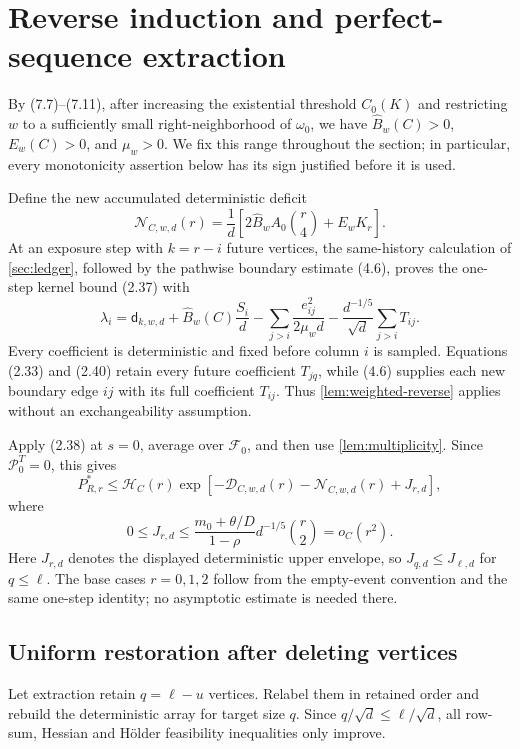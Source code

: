 \section{Reverse induction and perfect-sequence extraction}\label{sec:induction}

By (7.7)--(7.11), after increasing the existential threshold \(C_0(K)\) and
restricting \(w\) to a sufficiently small right-neighborhood of
\(\omega_0\), we have
\(\widehat B_w(C)>0\), \(E_w(C)>0\), and \(\mu_w>0\).  We fix this range
throughout the section; in particular, every monotonicity assertion below
has its sign justified before it is used.

Define the new accumulated deterministic deficit
\[
 \mathcal N_{C,w,d}(r)=\frac1d\left[
 2\widehat B_wA_0\binom r4+E_wK_r\right].
\tag{6.1}
\]
At an exposure step with \(k=r-i\) future vertices, the same-history
calculation of \cref{sec:ledger}, followed by the pathwise boundary estimate
(4.6), proves the one-step kernel bound (2.37) with
\[
 \lambda_i=\mathsf d_{k,w,d}
 +\widehat B_w(C)\frac{S_i}{d}
 -\sum_{j>i}\frac{e_{ij}^2}{2\mu_wd}
 -\frac{d^{-1/5}}{\sqrt d}\sum_{j>i}T_{ij}.
\tag{6.2}
\]
Every coefficient is deterministic and fixed before column \(i\) is
sampled.  Equations (2.33) and (2.40) retain every future coefficient
\(T_{jq}\), while (4.6) supplies each new boundary edge \(ij\) with its full
coefficient \(T_{ij}\).  Thus \cref{lem:weighted-reverse} applies without an
exchangeability assumption.

Apply (2.38) at \(s=0\), average over \(\mathcal F_0\), and then use
\cref{lem:multiplicity}.  Since \(\mathcal P_0^T=0\), this gives
\[
P^*_{R,r}\le\mathcal H_C(r)
\exp\!\left[-\mathcal D_{C,w,d}(r)
-\mathcal N_{C,w,d}(r)+J_{r,d}\right],
\tag{6.3}
\]
where
\[
0\le J_{r,d}\le
\frac{m_0+\theta/D}{1-\rho}d^{-1/5}\binom r2=o_C(r^2).
\tag{6.4}
\]
Here \(J_{r,d}\) denotes the displayed deterministic upper envelope, so
\(J_{q,d}\le J_{\ell,d}\) for \(q\le\ell\).  The base cases
\(r=0,1,2\) follow from the empty-event convention and the same one-step
identity; no asymptotic estimate is needed there.

\subsection{Uniform restoration after deleting vertices}

Let extraction retain \(q=\ell-u\) vertices.  Relabel them in retained order
and rebuild the deterministic array for target size \(q\).  Since
\(q/\sqrt d\le\ell/\sqrt d\), all row-sum, Hessian and H\"older feasibility
inequalities only improve.

